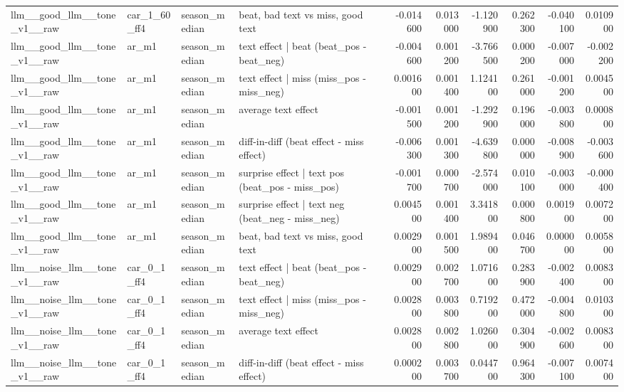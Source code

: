 \begin{table}
\begin{tabular}{llllrrrrrr}
llm\_\_good\_llm\_\_tone\_v1\_\_raw & car\_1\_60\_ff4 & season\_median & beat, bad text vs miss, good text & -0.014600 & 0.013000 & -1.120900 & 0.262300 & -0.040100 & 0.010900 \\
llm\_\_good\_llm\_\_tone\_v1\_\_raw & ar\_m1 & season\_median & text effect | beat  (beat\_pos - beat\_neg) & -0.004600 & 0.001200 & -3.766500 & 0.000200 & -0.007000 & -0.002200 \\
llm\_\_good\_llm\_\_tone\_v1\_\_raw & ar\_m1 & season\_median & text effect | miss  (miss\_pos - miss\_neg) & 0.001600 & 0.001400 & 1.124100 & 0.261000 & -0.001200 & 0.004500 \\
llm\_\_good\_llm\_\_tone\_v1\_\_raw & ar\_m1 & season\_median & average text effect & -0.001500 & 0.001200 & -1.292900 & 0.196000 & -0.003800 & 0.000800 \\
llm\_\_good\_llm\_\_tone\_v1\_\_raw & ar\_m1 & season\_median & diff-in-diff (beat effect - miss effect) & -0.006300 & 0.001300 & -4.639800 & 0.000000 & -0.008900 & -0.003600 \\
llm\_\_good\_llm\_\_tone\_v1\_\_raw & ar\_m1 & season\_median & surprise effect | text pos (beat\_pos - miss\_pos) & -0.001700 & 0.000700 & -2.574000 & 0.010100 & -0.003000 & -0.000400 \\
llm\_\_good\_llm\_\_tone\_v1\_\_raw & ar\_m1 & season\_median & surprise effect | text neg (beat\_neg - miss\_neg) & 0.004500 & 0.001400 & 3.341800 & 0.000800 & 0.001900 & 0.007200 \\
llm\_\_good\_llm\_\_tone\_v1\_\_raw & ar\_m1 & season\_median & beat, bad text vs miss, good text & 0.002900 & 0.001500 & 1.989400 & 0.046700 & 0.000000 & 0.005800 \\
llm\_\_noise\_llm\_\_tone\_v1\_\_raw & car\_0\_1\_ff4 & season\_median & text effect | beat  (beat\_pos - beat\_neg) & 0.002900 & 0.002700 & 1.071600 & 0.283900 & -0.002400 & 0.008300 \\
llm\_\_noise\_llm\_\_tone\_v1\_\_raw & car\_0\_1\_ff4 & season\_median & text effect | miss  (miss\_pos - miss\_neg) & 0.002800 & 0.003800 & 0.719200 & 0.472000 & -0.004800 & 0.010300 \\
llm\_\_noise\_llm\_\_tone\_v1\_\_raw & car\_0\_1\_ff4 & season\_median & average text effect & 0.002800 & 0.002800 & 1.026000 & 0.304900 & -0.002600 & 0.008300 \\
llm\_\_noise\_llm\_\_tone\_v1\_\_raw & car\_0\_1\_ff4 & season\_median & diff-in-diff (beat effect - miss effect) & 0.000200 & 0.003700 & 0.044700 & 0.964300 & -0.007100 & 0.007400 \\

\end{tabular}
\end{table}
